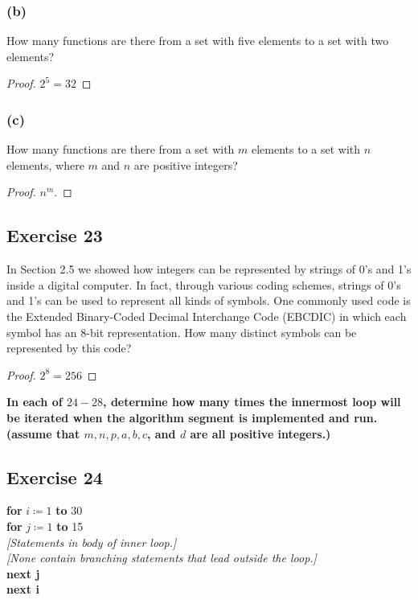 \documentclass[14pt]{extarticle}
\newcommand{\cy}{\color{cyan}}
\begin{document}
\subsubsection{(b)}
How many functions are there from a set with five elements to a set with two elements?

\begin{proof}
     \(2^5 = 32\)
\end{proof}

\subsubsection{(c)}
How many functions are there from a set with $m$ elements to a set with $n$ elements, where $m$ and $n$ are positive
integers?

\begin{proof}
     \(n^m\).
\end{proof}

\subsection{Exercise 23}
In Section 2.5 we showed how integers can be represented by strings of 0’s and 1’s inside a digital computer. In fact,
through various coding schemes, strings of 0’s and 1’s can be used to represent all kinds of symbols. One commonly
used code is the Extended Binary-Coded Decimal Interchange Code (EBCDIC) in which each symbol has an 8-bit
representation. How many distinct symbols can be represented by this code?

\begin{proof}
     \(2^8 = 256\)
\end{proof}

{\bf \cy In each of $24-28$, determine how many times the innermost loop will be iterated when the algorithm segment
is implemented and run. (assume that \(m, n, p, a, b, c\), and $d$ are all positive integers.)}

\subsection{Exercise 24}
\begin{tabbing}
     {\bf for} \= \(i \coloneqq 1\) {\bf to} 30 \\
     \> {\bf for} \= \(j \coloneqq 1\) {\bf to} 15 \\
     \>           \> {\it [Statements in body of inner loop.]} \\
     \>           \> {\it [None contain branching statements that lead outside the loop.]} \\
     \> {\bf next j} \\
     {\bf next i}
\end{tabbing}
\end{document}
